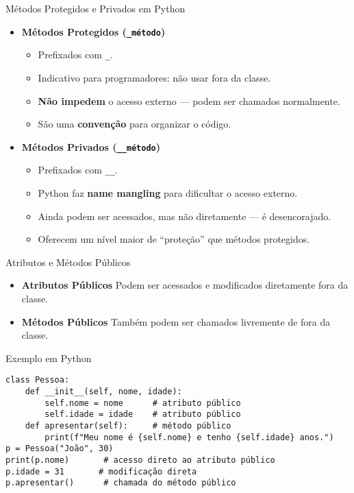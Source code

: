 \begin{frame}[fragile]{Métodos Protegidos e Privados em Python}
\begin{itemize}
    \item \textbf{Métodos Protegidos (\texttt{\_método})}
    \begin{itemize}
\item Prefixados com \texttt{\_}.
\item Indicativo para programadores: não usar fora da classe.
\item \textbf{Não impedem} o acesso externo — podem ser chamados normalmente.
\item São uma \textbf{convenção} para organizar o código.
\end{itemize}
\item \textbf{Métodos Privados (\texttt{\_\_método})}
\begin{itemize}
\item Prefixados com \texttt{\_\_}.
\item Python faz \textbf{name mangling} para dificultar o acesso externo.
\item Ainda podem ser acessados, mas não diretamente — é desencorajado.
\item Oferecem um nível maior de “proteção” que métodos protegidos.
\end{itemize}
\end{itemize}







\end{frame}


\begin{frame}[fragile]{Atributos e Métodos Públicos}

\begin{itemize}
    \item \textbf{Atributos Públicos}
Podem ser acessados e modificados diretamente fora da classe.
\item \textbf{Métodos Públicos}
Também podem ser chamados livremente de fora da classe.
\end{itemize}




\begin{exampleblock}{Exemplo em Python}
\begin{verbatim}
class Pessoa:
    def __init__(self, nome, idade):
        self.nome = nome      # atributo público
        self.idade = idade    # atributo público
    def apresentar(self):     # método público
        print(f"Meu nome é {self.nome} e tenho {self.idade} anos.")
p = Pessoa("João", 30)
print(p.nome)       # acesso direto ao atributo público
p.idade = 31       # modificação direta
p.apresentar()      # chamada do método público
\end{verbatim}
\end{exampleblock}

\end{frame}

